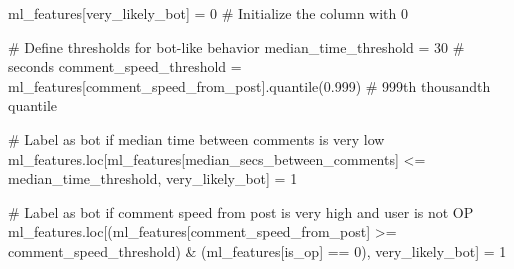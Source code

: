 \documentclass[
  12pt,
  letterpaper,
  DIV=11,
  numbers=noendperiod]{scrartcl}
\newenvironment{Shaded}{\begin{snugshade}}{\end{snugshade}}
\newcommand{\CommentTok}[1]{\textcolor[rgb]{0.37,0.37,0.37}{#1}}
\newcommand{\DecValTok}[1]{\textcolor[rgb]{0.68,0.00,0.00}{#1}}
\newcommand{\FloatTok}[1]{\textcolor[rgb]{0.68,0.00,0.00}{#1}}
\newcommand{\NormalTok}[1]{\textcolor[rgb]{0.00,0.23,0.31}{#1}}
\newcommand{\OperatorTok}[1]{\textcolor[rgb]{0.37,0.37,0.37}{#1}}
\newcommand{\StringTok}[1]{\textcolor[rgb]{0.13,0.47,0.30}{#1}}
\begin{document}
\begin{Shaded}
\begin{Highlighting}[]
\NormalTok{ml\_features[}\StringTok{\textquotesingle{}very\_likely\_bot\textquotesingle{}}\NormalTok{] }\OperatorTok{=} \DecValTok{0}  \CommentTok{\# Initialize the column with 0}

\CommentTok{\# Define thresholds for bot{-}like behavior}
\NormalTok{median\_time\_threshold }\OperatorTok{=} \DecValTok{30}  \CommentTok{\# seconds}
\NormalTok{comment\_speed\_threshold }\OperatorTok{=}\NormalTok{ ml\_features[}\StringTok{\textquotesingle{}comment\_speed\_from\_post\textquotesingle{}}\NormalTok{].quantile(}\FloatTok{0.999}\NormalTok{)  }\CommentTok{\# 999th thousandth quantile}

\CommentTok{\# Label as bot if median time between comments is very low}
\NormalTok{ml\_features.loc[ml\_features[}\StringTok{\textquotesingle{}median\_secs\_between\_comments\textquotesingle{}}\NormalTok{] }\OperatorTok{\textless{}=}\NormalTok{ median\_time\_threshold, }\StringTok{\textquotesingle{}very\_likely\_bot\textquotesingle{}}\NormalTok{] }\OperatorTok{=} \DecValTok{1}

\CommentTok{\# Label as bot if comment speed from post is very high and user is not OP}
\NormalTok{ml\_features.loc[(ml\_features[}\StringTok{\textquotesingle{}comment\_speed\_from\_post\textquotesingle{}}\NormalTok{] }\OperatorTok{\textgreater{}=}\NormalTok{ comment\_speed\_threshold) }\OperatorTok{\&}\NormalTok{ (ml\_features[}\StringTok{\textquotesingle{}is\_op\textquotesingle{}}\NormalTok{] }\OperatorTok{==} \DecValTok{0}\NormalTok{), }\StringTok{\textquotesingle{}very\_likely\_bot\textquotesingle{}}\NormalTok{] }\OperatorTok{=} \DecValTok{1}


\end{Highlighting}
\end{Shaded}
\end{document}
